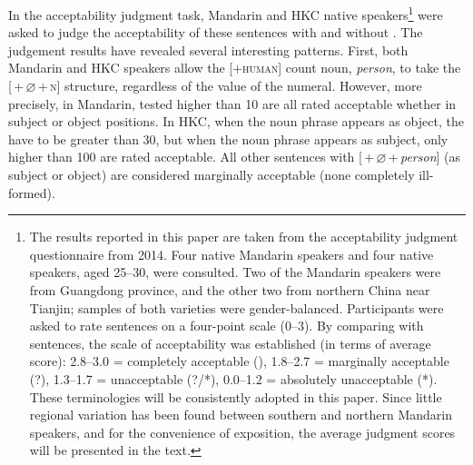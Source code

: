 \documentclass[output=paper]{langsci/langscibook}
\begin{document}
In the acceptability judgment task, Mandarin and \gls{HKC} native
speakers\footnote{The results reported in this paper are taken from the
    acceptability judgment questionnaire from 2014. Four native
    Mandarin speakers and four native 
    speakers, aged 25--30,
    were consulted. Two of the Mandarin speakers were from Guangdong
    province, and the other two from northern China near Tianjin; samples of
    both varieties were gender-balanced. Participants were asked to rate
    sentences on a four-point scale (0--3). By comparing with  sentences,
    the scale of acceptability was established (in terms of average score):
    2.8--3.0 = completely acceptable (), 1.8--2.7 = marginally acceptable (?),
    1.3--1.7 = unacceptable (?/*), 0.0--1.2 = absolutely unacceptable (*). These
    terminologies will be consistently adopted in this paper. Since little
    regional variation has been found between southern and northern Mandarin
speakers, and for the convenience of exposition, the average judgment scores
will be presented in the text.} were asked to judge the acceptability of these
sentences with and without . The judgement results have revealed
several interesting patterns.  First, both Mandarin and \gls{HKC} speakers
allow the [+\textsc{human}] count noun, \emph{person}, to take the [\Num{}\,+\,$\varnothing$\,+\,\textsc{n}] 
structure, regardless of the value of the numeral. However,
more precisely, in Mandarin, tested  higher than 10 are all rated
acceptable whether in subject or object positions.  In \gls{HKC}, when the noun
phrase appears as object, the  have to be greater than 30, but when the
noun phrase appears as subject, only  higher than 100 are rated
acceptable. All other sentences with [\Num{}\,+\,${\varnothing}$\,+\,\emph{person}]
(as subject or object) are considered marginally acceptable (none completely
ill-formed).
\end{document}
